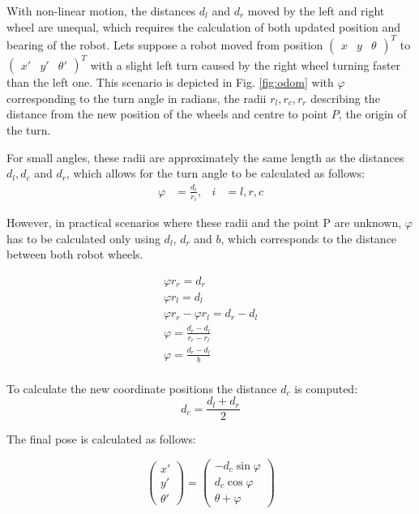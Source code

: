 With non-linear motion, the distances $d_{l}$ and $d_{r}$ moved by the left and right wheel are unequal, which requires the calculation of both updated position and bearing of the robot. 
Lets suppose a robot moved from position $\begin{pmatrix} x & y & \theta \end{pmatrix}^{T}$ to $\begin{pmatrix} x' & y' & \theta' \end{pmatrix}^{T}$ with a slight left turn caused by the right wheel turning faster than the left one. 
This scenario is depicted in Fig. \ref{fig:odom} with $\varphi$ corresponding to the turn angle in radians, the radii $r_{l}, r_{c}, r_{r}$ describing the distance from the new position of the wheels and centre to point $P$, the origin of the turn. 

For small angles, these radii are approximately the same length as the distances $d_{l}, d_{c}$ and $d_{r}$, which allows for the turn angle to be calculated as follows:
\begin{align*}
	\varphi &= \frac{d_{i}}{r_{i}}, & i &= l, r, c  
\end{align*}

However, in practical scenarios where these radii and the point P are unknown, $\varphi$ has to be calculated only using $d_{l}$, $d_{r}$ and $b$, which corresponds to the distance between both robot wheels.

\begin{equation*}
	\begin{split}
		\varphi r_{r} = d_{r} \\
		\varphi r_{l} = d_{l} \\
		\varphi r_{r} - \varphi r_{l} = d_{r} - d_{l} \\
		\varphi = \frac{d_{r} - d_{l}}{r_{r} - r_{l}} \\ 
		\varphi = \frac{d_{r} - d_{l}}{b} \\
	\end{split}
\end{equation*}

To calculate the new coordinate positions the distance $d_{c}$ is computed:
\begin{equation*}
	d_{c} = \frac{d_{l} + d_{r}}{2}
\end{equation*}

The final pose is calculated as follows:

\begin{equation*}
	\begin{pmatrix}
		x' \\ 
		y' \\
		\theta'
	\end{pmatrix}
	= 
	\begin{pmatrix}
		-d_{c} \sin \varphi \\
		d_{c} \cos \varphi \\ 
		\theta + \varphi
	\end{pmatrix}
\end{equation*}

